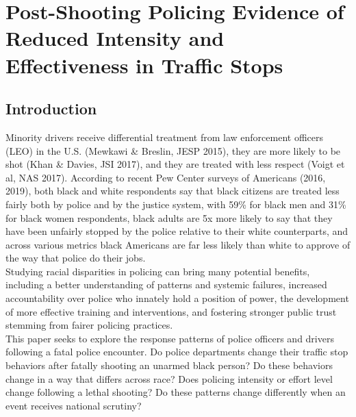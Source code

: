 \chapter[Chapter 1]{Post-Shooting Policing Evidence of Reduced Intensity and Effectiveness in Traffic Stops}

\graphicspath{{C:/Users/david/coding/02_TRAFFIC_BIAS_paper/6000_LaTeX/figures/}}

\section{Introduction} 
Minority drivers receive differential treatment from law enforcement officers (LEO) in the U.S. (Mewkawi \& Breslin, JESP 2015), they are more likely to be shot (Khan \& Davies, JSI 2017), and they are treated with less respect (Voigt et al, NAS 2017). According to recent Pew Center surveys of Americans (2016, 2019), both black and white respondents say that black citizens are treated less fairly both by police and by the justice system, with 59\% for black men and 31\% for black women respondents, black adults are 5x more likely to say that they have been unfairly stopped by the police relative to their white counterparts, and across various metrics black Americans are far less likely than white to approve of the way that police do their jobs. \\

Studying racial disparities in policing can bring many potential benefits, including a better understanding of patterns and systemic failures, increased accountability over police who innately hold a position of power, the development of more effective training and interventions, and fostering stronger public trust stemming from fairer policing practices. \\

This paper seeks to explore the response patterns of police officers and drivers following a fatal police encounter. Do police departments change their traffic stop behaviors after fatally shooting an unarmed black person? Do these behaviors change in a way that differs across race? Does policing intensity or effort level change following a lethal shooting? Do these patterns change differently when an event receives national scrutiny? \\ 

